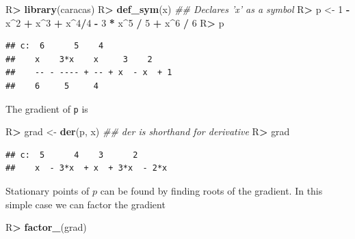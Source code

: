 \documentclass[10pt,]{article}
\newenvironment{Shaded}{\begin{snugshade}}{\end{snugshade}}
\newcommand{\CommentTok}[1]{\textcolor[rgb]{0.56,0.35,0.01}{\textit{#1}}}
\newcommand{\DecValTok}[1]{\textcolor[rgb]{0.00,0.00,0.81}{#1}}
\newcommand{\KeywordTok}[1]{\textcolor[rgb]{0.13,0.29,0.53}{\textbf{#1}}}
\newcommand{\NormalTok}[1]{#1}
\newcommand{\OperatorTok}[1]{\textcolor[rgb]{0.81,0.36,0.00}{\textbf{#1}}}
\newcommand{\StringTok}[1]{\textcolor[rgb]{0.31,0.60,0.02}{#1}}
\begin{document}
\begin{Shaded}
\begin{Highlighting}[]
\NormalTok{R}\OperatorTok{>}\StringTok{ }\KeywordTok{library}\NormalTok{(caracas)}
\NormalTok{R}\OperatorTok{>}\StringTok{ }\KeywordTok{def_sym}\NormalTok{(x) }\CommentTok{## Declares 'x' as a symbol}
\NormalTok{R}\OperatorTok{>}\StringTok{ }\NormalTok{p <-}\StringTok{ }\DecValTok{1} \OperatorTok{-}\StringTok{ }\NormalTok{x}\OperatorTok{^}\DecValTok{2} \OperatorTok{+}\StringTok{ }\NormalTok{x}\OperatorTok{^}\DecValTok{3} \OperatorTok{+}\StringTok{ }\NormalTok{x}\OperatorTok{^}\DecValTok{4}\OperatorTok{/}\DecValTok{4} \OperatorTok{-}\StringTok{ }\DecValTok{3} \OperatorTok{*}\StringTok{ }\NormalTok{x}\OperatorTok{^}\DecValTok{5} \OperatorTok{/}\StringTok{ }\DecValTok{5} \OperatorTok{+}\StringTok{ }\NormalTok{x}\OperatorTok{^}\DecValTok{6} \OperatorTok{/}\StringTok{ }\DecValTok{6}
\NormalTok{R}\OperatorTok{>}\StringTok{ }\NormalTok{p}
\end{Highlighting}
\end{Shaded}

\begin{verbatim}
## c:  6      5    4              
##    x    3*x    x     3    2    
##    -- - ---- + -- + x  - x  + 1
##    6     5     4
\end{verbatim}

The gradient of \texttt{p} is

\begin{Shaded}
\begin{Highlighting}[]
\NormalTok{R}\OperatorTok{>}\StringTok{ }\NormalTok{grad <-}\StringTok{ }\KeywordTok{der}\NormalTok{(p, x) }\CommentTok{## der is shorthand for derivative}
\NormalTok{R}\OperatorTok{>}\StringTok{ }\NormalTok{grad}
\end{Highlighting}
\end{Shaded}

\begin{verbatim}
## c:  5      4    3      2      
##    x  - 3*x  + x  + 3*x  - 2*x
\end{verbatim}

Stationary points of \(p\) can be found by finding roots of the
gradient. In this simple case we can factor the gradient

\begin{Shaded}
\begin{Highlighting}[]
\NormalTok{R}\OperatorTok{>}\StringTok{ }\KeywordTok{factor_}\NormalTok{(grad)}
\end{Highlighting}
\end{Shaded}
\end{document}

